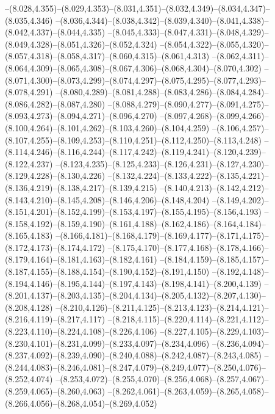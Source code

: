   --(8.028,4.355)--(8.029,4.353)--(8.031,4.351)--(8.032,4.349)--(8.034,4.347)--(8.035,4.346)%
  --(8.036,4.344)--(8.038,4.342)--(8.039,4.340)--(8.041,4.338)--(8.042,4.337)--(8.044,4.335)%
  --(8.045,4.333)--(8.047,4.331)--(8.048,4.329)--(8.049,4.328)--(8.051,4.326)--(8.052,4.324)%
  --(8.054,4.322)--(8.055,4.320)--(8.057,4.318)--(8.058,4.317)--(8.060,4.315)--(8.061,4.313)%
  --(8.062,4.311)--(8.064,4.309)--(8.065,4.308)--(8.067,4.306)--(8.068,4.304)--(8.070,4.302)%
  --(8.071,4.300)--(8.073,4.299)--(8.074,4.297)--(8.075,4.295)--(8.077,4.293)--(8.078,4.291)%
  --(8.080,4.289)--(8.081,4.288)--(8.083,4.286)--(8.084,4.284)--(8.086,4.282)--(8.087,4.280)%
  --(8.088,4.279)--(8.090,4.277)--(8.091,4.275)--(8.093,4.273)--(8.094,4.271)--(8.096,4.270)%
  --(8.097,4.268)--(8.099,4.266)--(8.100,4.264)--(8.101,4.262)--(8.103,4.260)--(8.104,4.259)%
  --(8.106,4.257)--(8.107,4.255)--(8.109,4.253)--(8.110,4.251)--(8.112,4.250)--(8.113,4.248)%
  --(8.114,4.246)--(8.116,4.244)--(8.117,4.242)--(8.119,4.241)--(8.120,4.239)--(8.122,4.237)%
  --(8.123,4.235)--(8.125,4.233)--(8.126,4.231)--(8.127,4.230)--(8.129,4.228)--(8.130,4.226)%
  --(8.132,4.224)--(8.133,4.222)--(8.135,4.221)--(8.136,4.219)--(8.138,4.217)--(8.139,4.215)%
  --(8.140,4.213)--(8.142,4.212)--(8.143,4.210)--(8.145,4.208)--(8.146,4.206)--(8.148,4.204)%
  --(8.149,4.202)--(8.151,4.201)--(8.152,4.199)--(8.153,4.197)--(8.155,4.195)--(8.156,4.193)%
  --(8.158,4.192)--(8.159,4.190)--(8.161,4.188)--(8.162,4.186)--(8.164,4.184)--(8.165,4.183)%
  --(8.166,4.181)--(8.168,4.179)--(8.169,4.177)--(8.171,4.175)--(8.172,4.173)--(8.174,4.172)%
  --(8.175,4.170)--(8.177,4.168)--(8.178,4.166)--(8.179,4.164)--(8.181,4.163)--(8.182,4.161)%
  --(8.184,4.159)--(8.185,4.157)--(8.187,4.155)--(8.188,4.154)--(8.190,4.152)--(8.191,4.150)%
  --(8.192,4.148)--(8.194,4.146)--(8.195,4.144)--(8.197,4.143)--(8.198,4.141)--(8.200,4.139)%
  --(8.201,4.137)--(8.203,4.135)--(8.204,4.134)--(8.205,4.132)--(8.207,4.130)--(8.208,4.128)%
  --(8.210,4.126)--(8.211,4.125)--(8.213,4.123)--(8.214,4.121)--(8.216,4.119)--(8.217,4.117)%
  --(8.218,4.115)--(8.220,4.114)--(8.221,4.112)--(8.223,4.110)--(8.224,4.108)--(8.226,4.106)%
  --(8.227,4.105)--(8.229,4.103)--(8.230,4.101)--(8.231,4.099)--(8.233,4.097)--(8.234,4.096)%
  --(8.236,4.094)--(8.237,4.092)--(8.239,4.090)--(8.240,4.088)--(8.242,4.087)--(8.243,4.085)%
  --(8.244,4.083)--(8.246,4.081)--(8.247,4.079)--(8.249,4.077)--(8.250,4.076)--(8.252,4.074)%
  --(8.253,4.072)--(8.255,4.070)--(8.256,4.068)--(8.257,4.067)--(8.259,4.065)--(8.260,4.063)%
  --(8.262,4.061)--(8.263,4.059)--(8.265,4.058)--(8.266,4.056)--(8.268,4.054)--(8.269,4.052)%
